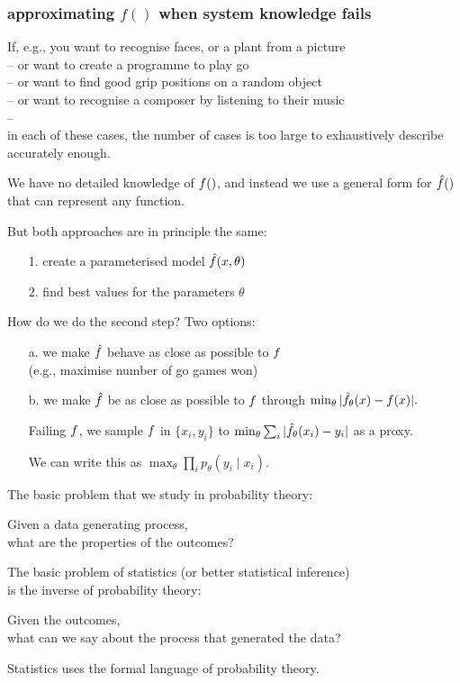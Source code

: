 \documentclass[USenglish,pdftex,compress,10pt,svgnamesi]{beamer}%
\begin{document}
\begin{frame}
\frametitle{approximating $f()$ when system knowledge fails}
If, e.g., you want to recognise faces, or a plant from a picture\\
 -- or want to create a programme to play go\\
 -- or want to find good grip positions on a random object\\
 -- or want to recognise a composer by listening to their music\\
 --\\
in each of these cases, the number of cases is too large to exhaustively describe accurately enough.

We have no detailed knowledge of $f()$, and instead we use a general form for $\hat{f}()$ that can represent any function.
\end{frame}
\begin{frame}
But both approaches are in principle the same:
\begin{enumerate}
\item[1.] create a parameterised model $\hat{f}(x,\theta)$
\item[2.] find best values for the parameters $\theta$
\end{enumerate}

How do we do the second step?  Two options:\\
\begin{enumerate}
\item[a.] we make $\hat{f}$ behave as close as possible to $f$ \\(e.g., maximise number of go games won)
\item[b.] we make $\hat{f}$ be as close as possible to $f$ through
$
\min_\theta | \hat{f}_\theta(x) - f(x) |.
$

Failing $f$, we sample $f$ in $\{x_i, y_i\}$ to 
$
\min_\theta \sum_i | \hat{f}_\theta(x_i) - y_i |
$
as a proxy.

We can write this as $\max_\theta \prod_i p_\theta (y_i \mid x_i)$.
\end{enumerate}

\end{frame}

\begin{frame}

The basic problem that we study in probability theory:
\begin{center}
Given a data generating process,\\ what are the properties of the outcomes?
\end{center}
The basic problem of statistics (or better statistical inference) \\is the inverse of probability theory:
\begin{center}
Given the outcomes,\\
what can we say about the process that generated the data?
\end{center}
Statistics uses the formal language of probability theory.

\end{frame}
\end{document}
